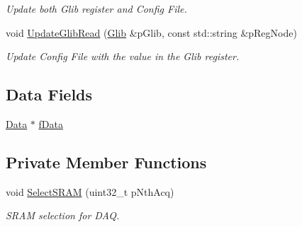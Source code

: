 \begin{DoxyCompactItemize}
\begin{DoxyCompactList}\small\item\em Update both Glib register and Config File. \end{DoxyCompactList}\item 
void \hyperlink{class_ph2___hw_interface_1_1_glib_interface_a1ab42500cf3f6369a8eb2404ef8cd85b}{Update\-Glib\-Read} (\hyperlink{class_ph2___hw_description_1_1_glib}{Glib} \&p\-Glib, const std\-::string \&p\-Reg\-Node)
\begin{DoxyCompactList}\small\item\em Update Config File with the value in the Glib register. \end{DoxyCompactList}\end{DoxyCompactItemize}
\subsection*{Data Fields}
\begin{DoxyCompactItemize}
\item 
\hyperlink{class_ph2___hw_interface_1_1_data}{Data} $\ast$ \hyperlink{class_ph2___hw_interface_1_1_glib_interface_ae0e95a15055342afd67e1f46aab1481c}{f\-Data}
\end{DoxyCompactItemize}
\subsection*{Private Member Functions}
\begin{DoxyCompactItemize}
\item 
void \hyperlink{class_ph2___hw_interface_1_1_glib_interface_a014fc0ea74353469aa54e4eecaffb225}{Select\-S\-R\-A\-M} (uint32\-\_\-t p\-Nth\-Acq)
\begin{DoxyCompactList}\small\item\em S\-R\-A\-M selection for D\-A\-Q. \end{DoxyCompactList}\end{DoxyCompactItemize}
